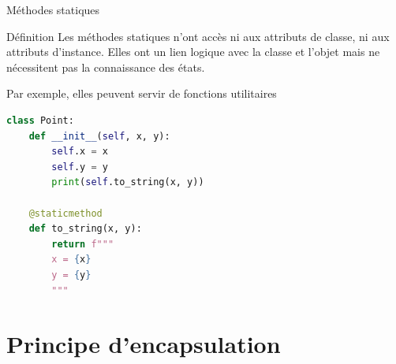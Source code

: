 \documentclass[10pt]{beamer}
\begin{document}









\begin{frame}[fragile]{Méthodes statiques}

  \begin{block}{Définition}
    \medskip
    Les méthodes statiques n'ont accès ni aux attributs de classe, ni aux attributs d'instance. Elles ont un lien logique avec la classe et l'objet mais ne nécessitent pas la connaissance des états.

    Par exemple, elles peuvent servir de fonctions utilitaires

  \end{block}
\begin{lstlisting}[language=Python, numbers=none, morekeywords={@staticmethod}]
class Point:
    def __init__(self, x, y):
        self.x = x
        self.y = y
        print(self.to_string(x, y))

    @staticmethod
    def to_string(x, y):
        return f"""
        x = {x}
        y = {y}         
        """
\end{lstlisting}
\end{frame}



\section{Principe d'encapsulation}
\end{document}
